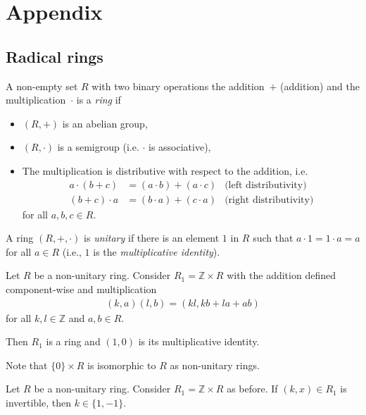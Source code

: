 \section*{Appendix}

\fancyhf{}
\fancyfoot[R]{\thepage}
\fancyhead[L]{\course}
\setlength{\headheight}{14pt}



\subsection{Radical rings}
    \begin{definition}
         A non-empty set $R$ with two binary operations the addition~$+$ (addition) and the multiplication~$\cdot$ is a \emph{ring} if
    \begin{itemize}
        \item $(R,+)$ is an abelian group,
        \item $(R,\cdot)$ is a semigroup (i.e. $\cdot$ is associative),
        \item The multiplication is distributive with respect to the addition, i.e.
        \begin{align*}
            a\cdot (b+c)&=(a\cdot b)+(a\cdot c)&\text{(left distributivity)}\\
            (b+c)\cdot a&=(b\cdot a)+(c\cdot a)&\text{(right distributivity)}
        \end{align*}
        for all $a,b,c\in R$.
    \end{itemize}
    A ring $(R,+,\cdot)$ is \emph{unitary} if there is an element $1$ in $R$ such that $a\cdot 1= 1\cdot a=a$ for all $a \in R$ (i.e., $1$ is the \emph{multiplicative identity}).
    \end{definition}

    Let $R$ be a non-unitary ring. Consider $R_1 = \mathbb{Z}\times R$ with the addition defined component-wise and multiplication
    \begin{align*}
        (k,a)(l,b)=(kl,kb+la+ab)
    \end{align*}
    for all $k,l\in \mathbb{Z}$ and $a,b\in R$.
    
    Then $R_1$ is a ring and $(1, 0)$ is its multiplicative identity.
    
    Note that $\{0\}\times R$ is isomorphic to $R$ as non-unitary rings.

    \begin{exercise}\label{ex:invertible elements}
         Let $R$ be a non-unitary ring. Consider $R_1 = \mathbb{Z}\times R$ as before. If $(k,x)\in R_1$ is invertible, then $k \in\{1,-1\}$.
    \end{exercise}

